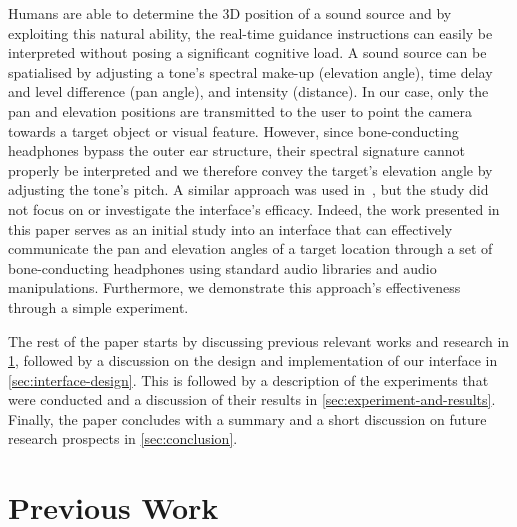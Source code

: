 \documentclass{llncs}
\begin{document}
Humans are able to determine the 3D position of a sound source and by exploiting this natural ability, the real-time guidance instructions can easily be interpreted without posing a significant cognitive load.
A sound source can be spatialised by adjusting a tone's spectral make-up (elevation angle), time delay and level difference (pan angle), and intensity (distance).
In our case, only the pan and elevation positions are transmitted to the user to point the camera towards a target object or visual feature.
However, since bone-conducting headphones bypass the outer ear structure, their spectral signature cannot properly be interpreted and we therefore convey the target's elevation angle by adjusting the tone's pitch.
A similar approach was used in~\cite{durette2008visuo}, but the study did not focus on or investigate the interface's efficacy.
Indeed, the work presented in this paper serves as an initial study into an interface that can effectively communicate the pan and elevation angles of a target location through a set of bone-conducting headphones using standard audio libraries and audio manipulations.
Furthermore, we demonstrate this approach's effectiveness through a simple experiment.

The rest of the paper starts by discussing previous relevant works and research in \cref{sec:prev-work}, followed by a discussion on the design and implementation of our interface in \cref{sec:interface-design}.
This is followed by a description of the experiments that were conducted and a discussion of their results in \cref{sec:experiment-and-results}.
Finally, the paper concludes with a summary and a short discussion on future research prospects in \cref{sec:conclusion}.

\section{Previous Work}\label{sec:prev-work}
\end{document}
